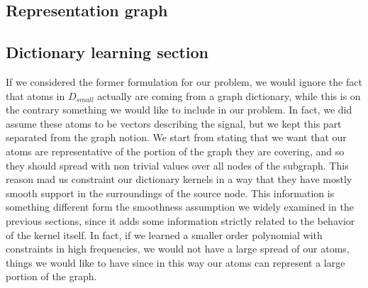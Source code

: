 \subsection{Representation graph}

\subsection{Dictionary learning section}
If we considered the former formulation for our problem, we would ignore the fact that atoms in $D_{small}$ actually are coming from a graph dictionary, while this is on the contrary something we would like to include in our problem. In fact, we did assume these atoms to be vectors describing the signal, but we kept this part separated from the graph notion. We start from stating that we want that our atoms are representative of the portion of the graph they are covering, and so they should spread with non trivial values over all nodes of the subgraph. This reason mad us constraint our dictionary kernels in a way that they have mostly smooth support in the surroundings of the source node. This information is something different form the smoothness assumption we widely examined in the previous sections, since it adds some information strictly related to the behavior of the kernel itself. In fact, if we learned a smaller order polynomial with constraints in high frequencies, we would not have a large spread of our atoms, things we would like to have since in this way our atoms can represent a large portion of the graph. 


